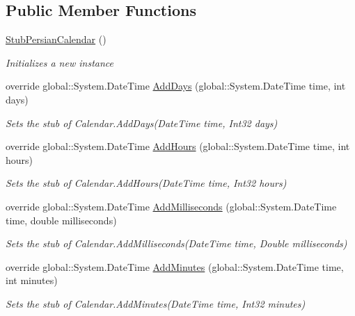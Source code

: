 \subsection*{Public Member Functions}
\begin{DoxyCompactItemize}
\item 
\hyperlink{class_system_1_1_globalization_1_1_fakes_1_1_stub_persian_calendar_adfaac6ec4d24ef94cbfa3f62064b1ed1}{Stub\-Persian\-Calendar} ()
\begin{DoxyCompactList}\small\item\em Initializes a new instance\end{DoxyCompactList}\item 
override global\-::\-System.\-Date\-Time \hyperlink{class_system_1_1_globalization_1_1_fakes_1_1_stub_persian_calendar_a5ee13f4ac65fc3e8a85615b765f027e4}{Add\-Days} (global\-::\-System.\-Date\-Time time, int days)
\begin{DoxyCompactList}\small\item\em Sets the stub of Calendar.\-Add\-Days(\-Date\-Time time, Int32 days)\end{DoxyCompactList}\item 
override global\-::\-System.\-Date\-Time \hyperlink{class_system_1_1_globalization_1_1_fakes_1_1_stub_persian_calendar_a594c738995afd26dfda81f38da5f034d}{Add\-Hours} (global\-::\-System.\-Date\-Time time, int hours)
\begin{DoxyCompactList}\small\item\em Sets the stub of Calendar.\-Add\-Hours(\-Date\-Time time, Int32 hours)\end{DoxyCompactList}\item 
override global\-::\-System.\-Date\-Time \hyperlink{class_system_1_1_globalization_1_1_fakes_1_1_stub_persian_calendar_a0ba26df5846651cd72f837997cc909c3}{Add\-Milliseconds} (global\-::\-System.\-Date\-Time time, double milliseconds)
\begin{DoxyCompactList}\small\item\em Sets the stub of Calendar.\-Add\-Milliseconds(\-Date\-Time time, Double milliseconds)\end{DoxyCompactList}\item 
override global\-::\-System.\-Date\-Time \hyperlink{class_system_1_1_globalization_1_1_fakes_1_1_stub_persian_calendar_ad3b894f399c934f9dc1a9c552ced8f7e}{Add\-Minutes} (global\-::\-System.\-Date\-Time time, int minutes)
\begin{DoxyCompactList}\small\item\em Sets the stub of Calendar.\-Add\-Minutes(\-Date\-Time time, Int32 minutes)\end{DoxyCompactList}\item 

\end{DoxyCompactItemize}
